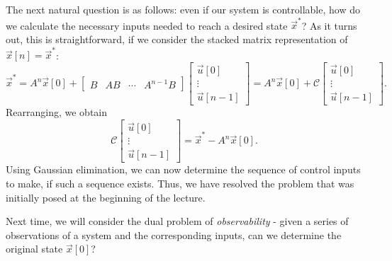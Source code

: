 \documentclass[letterpaper]{article}
\theoremstyle{remark}
\newcommand{\mat}[1]{\ensuremath{\begin{bmatrix}#1\end{bmatrix}}}
\begin{document}
The next natural question is as follows: even if our system is controllable, how do we calculate the necessary inputs needed to reach a desired state $\vec{x}^*$? As it turns out, this is straightforward, if we consider the stacked matrix representation of $\vec{x}[n] = \vec{x}^*$:
\[
    \vec{x}^* = A^n\vec{x}[0] + \mat{B & AB & \cdots & A^{n - 1}B} \mat{\vec{u}[0] \\ \vdots \\ \vec{u}[n - 1]} = A^n\vec{x}[0] + \mathscr{C}\mat{\vec{u}[0] \\ \vdots \\ \vec{u}[n - 1]}.
\]
Rearranging, we obtain
\[
    \mathscr{C}\mat{\vec{u}[0] \\ \vdots \\ \vec{u}[n - 1]} = \vec{x}^* - A^n\vec{x}[0].
\]
Using Gaussian elimination, we can now determine the sequence of control inputs to make, if such a sequence exists. Thus, we have resolved the problem that was initially posed at the beginning of the lecture.

Next time, we will consider the dual problem of \emph{observability} - given a series of observations of a system and the corresponding inputs, can we determine the original state $\vec{x}[0]$?
\end{document}
